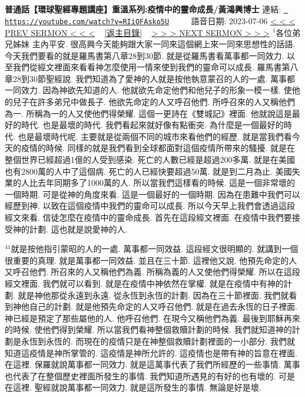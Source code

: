 \documentclass{book}
\begin{document}
\section{}
\label{sec:RIiOFAsko5U}
\textbf{普通話【環球聖經專題講座】重溫系列:疫情中的靈命成長/黃鴻興博士}
\newline
\newline
連結: \href{https://youtube.com/watch?v=RIiOFAsko5U}{\texttt{ https://youtube.com/watch?v=RIiOFAsko5U}} ~~~~ 語音日期: 2023-07-06 
\newline
\newline
\hyperref[sec:tf36g33yLwo]{\small{< < < PREV SERMON < < <}}
~
\hyperref[sec:index]{\small{[返主目錄]}}
~
\hyperref[sec:f7PBJM5qt9k]{\small{> > > NEXT SERMON > > >}}
\newline
\newline
$^{1}$各位弟兄姊妹 主內平安.
很高興今天能夠跟大家一同來這個網上來一同來思想性的話語.
今天我們要看的就是羅馬書第八章28到30節.
就是從羅馬書看萬事都一同效力.
以至我們從經文裡面來看看神怎麼使用一情來使到我們的靈命可以成長.
羅馬書第八章28到30節聖經說.
我們知道為了愛神的人就是按他執意蒙召的人的一處.
萬事都一同效力.
因為神欲先知道的人.
他就欲先命定他們和他兒子的形象一模一樣.
使他的兒子在許多弟兄中做長子.
他欲先命定的人又呼召他們.
所呼召來的人又稱他們為一.
所稱為一的人又使他們得榮耀.
這個一更詩在《雙城記》裡面.
他就說這是最好的時代.
也是最壞的時代.
我們看起來就好像有點衝突.
為什麼是一個最好的時代.
也是最壞時代呢.
主要就是從兩個不同的城市來看他們的經歷.
就是當我們看今天的疫情的時候.
同樣的就是我們看到全球都面對這個疫情所帶來的騷擾.
就是在整個世界已經超過1億的人受到感染.
死亡的人數已經是超過200多萬.
就是在美國也有2800萬的人中了這個病.
死亡的人已經快要超過50萬.
就是到二月為止.
美國失業的人比去年同期多了1000萬的人.
所以當我們這樣看的時候.
這是一個非常壞的一個時期.
可是從神的角度來看.
這是一個最好的一個時期.
因為在患難中我們可以經歷到神.
以致在這個疫情中我們的靈命可以成長.
所以今天早上我們會透過這段經文來看.
信徒怎麼在疫情中的靈命成長.
首先在這段經文裡面.
在疫情中我們要接受神的計劃.
這也就是說愛神的人.

$^{41}$就是按他指引蒙昭的人的一處.
萬事都一同效益.
這段經文很明顯的.
就講到一個很重要的真理.
就是萬事都一同效益.
並且在三十節.
這裡他又說.
他預先命定的人又呼召他們.
所召來的人又稱他們為義.
所稱為義的人又使他們得榮耀.
所以在這段經文裡面.
我們就可以看到.
就是在疫情中神依然在掌權.
就是在疫情中有神的計劃.
就是神他那從永遠到永遠.
從永恆到永恆的計劃.
因為在三十節裡面.
我們就看到神他自己的計劃.
就是他預先命定的人又呼召他們.
就是在過去永恆的日子裡面.
神已經是預定了那些屬他的人.
他呼召他們.
在現今又稱他們為義.
最後到耶穌再來的時候.
使他們得到榮耀.
所以當我們看神整個救贖計劃的時候.
我們就知道神的計劃是永恆到永恆的.
而現在的疫情只是在神整個救贖計劃裡面的一小部分.
我們就知道這疫情是神所掌管的.
這疫情是神所允許的.
這疫情也是帶有神的旨意在裡面.
在這裡.
保羅就說萬事都一同效力.
就是這萬事代表了我們所經歷的一些事情.
萬事也代表了在整個歷史裡面所發生的事情.
我們知道所遇見的有好的也有壞的.
可是在這裡.
聖經就說萬事都一同效力.
就是這所發生的事情.
無論是好是壞.
\end{document}
